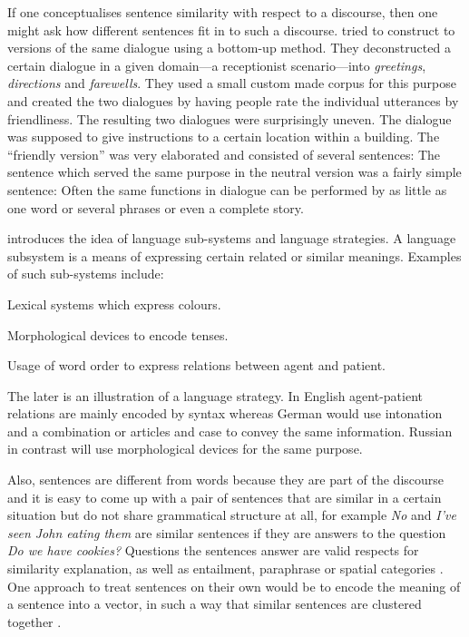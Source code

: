\documentclass[11pt]{article}
\begin{document}
If one conceptualises sentence similarity with respect to a discourse, then one might ask how different sentences fit in to such a discourse.  tried to construct to versions of the same dialogue using a bottom-up method. They deconstructed a certain dialogue in a given domain---a receptionist scenario---into \textit{greetings}, \textit{directions} and \textit{farewells}. They used a small custom made corpus for this purpose and created the two dialogues by having people rate the individual utterances by friendliness. The resulting two dialogues were surprisingly uneven. The dialogue was supposed to give instructions to a certain location within a building. The ``friendly version'' was very elaborated and consisted of several sentences:
The sentence which served the same purpose in the neutral version was a fairly simple sentence:
Often the same functions in dialogue can be performed by as little as one word or several phrases or even a complete story. 

 introduces the idea of language sub-systems and language strategies. A language subsystem is a means of expressing certain related or similar meanings. Examples of such sub-systems include:
\begin{compactitem}
    \item Lexical systems which express colours.
    \item Morphological devices to encode tenses.
    \item Usage of word order to express relations between agent and patient.
\end{compactitem}  
The later is an illustration of a language strategy. In English agent-patient relations are mainly encoded by syntax whereas German would use intonation and a combination or articles and case to convey the same information. Russian in contrast will use morphological devices for the same purpose. 

Also, sentences are different from words because they are part of the discourse and it is easy to come up with a pair of sentences that are similar in a certain situation but do not share grammatical structure at all, for example \textit{No} and \textit{I've seen John eating them} are similar sentences if they are answers to the question \textit{Do we have cookies?} Questions the sentences answer are valid respects for similarity explanation, as well as entailment, paraphrase \cite{White:2015:WSE:2838931.2838932} or spatial categories \cite{ritter-EtAl:2015:*SEM2015}. One approach to treat sentences on their own would be to encode the meaning of a sentence into a vector, in such a way that similar sentences are clustered together \cite{DBLP:journals/corr/abs-1003-4394,baroni2014frege,Socher:2012:SCT:2390948.2391084,wieting2015paraphrase,DBLP:journals/corr/HillCK16}.
\end{document}
